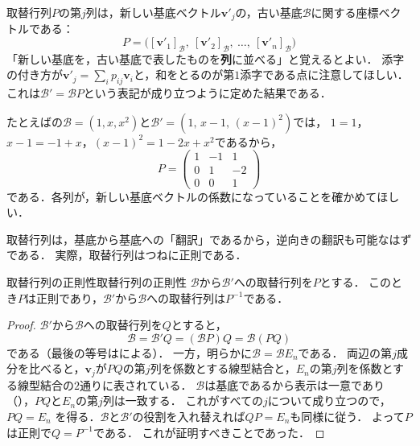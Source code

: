 \begin{remark}[取替行列の列の意味]
  取替行列$P$の第$j$列は，新しい基底ベクトル$\bm{v}'_j$の，古い基底$\mathcal{B}$に関する座標ベクトルである：
  \[
    P = \bigl( [\bm{v}'_1]_{\mathcal{B}},~ [\bm{v}'_2]_{\mathcal{B}},~ \dots,~ [\bm{v}'_n]_{\mathcal{B}} \bigr)
  \]
  「新しい基底を，古い基底で表したものを\textbf{列}に並べる」と覚えるとよい．
  添字の付き方が$\bm{v}'_j = \sum_i p_{ij} \bm{v}_i$と，和をとるのが第$1$添字である点に注意してほしい．
  これは$\mathcal{B}' = \mathcal{B}P$という表記が成り立つように定めた結果である．
\end{remark}

たとえばの$\mathcal{B}=(1,x,x^2)$と$\mathcal{B}'=(1,\,x-1,\,(x-1)^2)$では，
$1=1$，$x-1=-1+x$，$(x-1)^2=1-2x+x^2$であるから，
\[
  P=\begin{pmatrix} 1 & -1 & 1 \\ 0 & 1 & -2 \\ 0 & 0 & 1 \end{pmatrix}
\]
である．各列が，新しい基底ベクトルの係数になっていることを確かめてほしい．

取替行列は，基底から基底への「翻訳」であるから，逆向きの翻訳も可能なはずである．
実際，取替行列はつねに正則である．

\begin{prop}{取替行列の正則性}{取替行列の正則性}
  $\mathcal{B}$から$\mathcal{B}'$への取替行列を$P$とする．
  このとき$P$は正則であり，$\mathcal{B}'$から$\mathcal{B}$への取替行列は$P^{-1}$である．
\end{prop}

\begin{tleftbar}
\begin{proof}
  $\mathcal{B}'$から$\mathcal{B}$への取替行列を$Q$とすると，
  \[
    \mathcal{B} = \mathcal{B}' Q = (\mathcal{B}P)Q = \mathcal{B}(PQ)
  \]
  である（最後の等号はによる）．
  一方，明らかに$\mathcal{B} = \mathcal{B}E_n$である．
  両辺の第$j$成分を比べると，$\bm{v}_j$が$PQ$の第$j$列を係数とする線型結合と，$E_n$の第$j$列を係数とする線型結合の$2$通りに表されている．
  $\mathcal{B}$は基底であるから表示は一意であり（），$PQ$と$E_n$の第$j$列は一致する．
  これがすべての$j$について成り立つので，
  $PQ = E_n$
  を得る．$\mathcal{B}$と$\mathcal{B}'$の役割を入れ替えれば$QP = E_n$も同様に従う．
  よって$P$は正則で$Q = P^{-1}$である．
  これが証明すべきことであった．
\end{proof}
\end{tleftbar}

